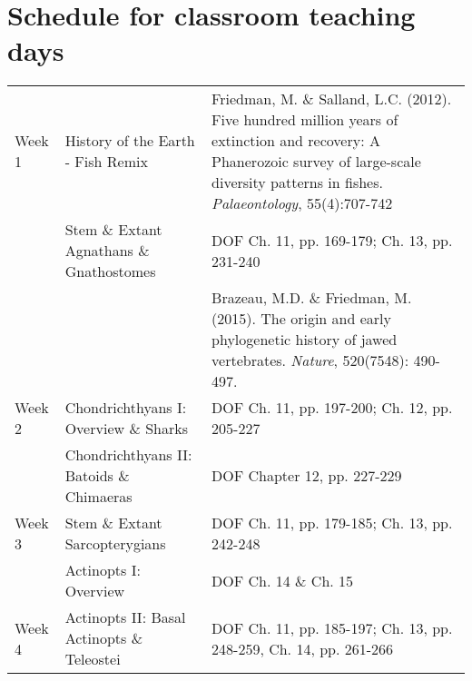\documentclass[letterpaper]{inzane_syllabus} %
\begin{document}
\newpage
\makeFullPage

\section{Schedule for classroom teaching days}

\begin{center}
\begin{tabularx}{\textwidth}{p{2cm}p{8cm}p{9.5cm}} %
\arrayrulecolor{myCOLOR}\hline
\multicolumn{3}{l}{\textbf{\textcolor{myCOLOR}{\large MODULE 1: Life's Building Blocks }}} \\
\hline
Week 1 & History of the Earth - Fish Remix & Friedman, M. \& Salland, L.C. (2012). Five hundred million years of extinction and recovery: A Phanerozoic survey of large-scale diversity patterns in fishes. \textit{Palaeontology}, 55(4):707-742 \\

& Stem \& Extant Agnathans \& Gnathostomes & DOF Ch. 11, pp. 169-179; Ch. 13, pp. 231-240  \\
& & Brazeau, M.D. \& Friedman, M. (2015). The origin and early phylogenetic history of jawed vertebrates. \textit{Nature}, 520(7548): 490-497.\\
\arrayrulecolor{maingray}\hline
Week 2 & Chondrichthyans I: Overview \& Sharks & DOF Ch. 11, pp. 197-200; Ch. 12, pp. 205-227\\

& Chondrichthyans II: Batoids \& Chimaeras & DOF Chapter 12, pp. 227-229 \\
\arrayrulecolor{maingray}\hline
Week 3 & Stem \& Extant Sarcopterygians & DOF Ch. 11, pp. 179-185; Ch. 13, pp. 242-248 \\

& Actinopts I: Overview & DOF Ch. 14 \& Ch. 15 \\
\arrayrulecolor{maingray}\hline
Week 4 & Actinopts II: Basal Actinopts \& Teleostei & DOF Ch. 11, pp. 185-197; Ch. 13, pp. 248-259, Ch. 14, pp. 261-266 \\


\end{tabularx}
\end{center}
\end{document}
